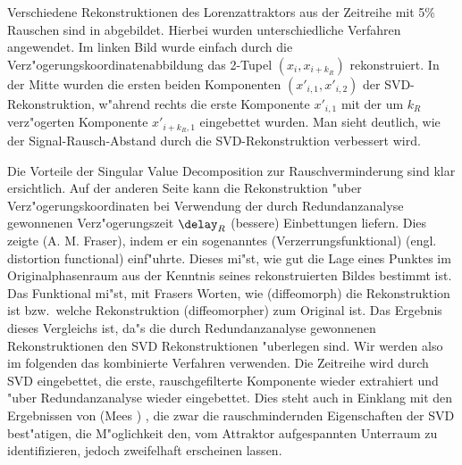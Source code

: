 Verschiedene Rekonstruktionen des Lorenzattraktors aus der Zeitreihe mit 5\% Rauschen sind
in  abgebildet. Hierbei wurden unterschiedliche Verfahren angewendet.
Im linken Bild wurde einfach durch die Verz"ogerungskoordinatenabbildung das 2-Tupel
$(x_i,x_{i+k_R})$ rekonstruiert. In der Mitte wurden die ersten beiden Komponenten
$(x'_{i,1},x'_{i,2})$ der SVD-Rekonstruktion, w"ahrend rechts die erste Komponente
$x'_{i,1}$ mit der um $k_R$ verz"ogerten Komponente $x'_{i+k_R,1}$ eingebettet wurden.
Man sieht deutlich, wie der Signal-Rausch-Abstand durch die SVD-Rekonstruktion verbessert
wird.


Die Vorteile der Singular Value Decomposition zur Rauschverminderung sind klar
ersichtlich. Auf der anderen Seite kann die Rekonstruktion "uber Verz"ogerungskoordinaten
bei Verwendung der durch Redundanzanalyse gewonnenen Verz"ogerungszeit $\delay_R$
\naja(bessere) Einbettungen liefern. Dies zeigte \autor(A. M. Fraser), indem er ein
sogenanntes \begriff(Verzerrungsfunktional) (engl. distortion functional)
einf"uhrte. Dieses mi"st, wie gut die Lage eines Punktes im Originalphasenraum aus der
Kenntnis seines rekonstruierten Bildes bestimmt ist\cite{Fraser}. Das Funktional mi"st,
mit Frasers Worten, wie \naja(diffeomorph) die Rekonstruktion ist bzw.\  welche
Rekonstruktion \naja(diffeomorpher) zum Original ist. Das Ergebnis dieses Vergleichs ist,
da"s die durch Redundanzanalyse gewonnenen Rekonstruktionen den SVD Rekonstruktionen
"uberlegen sind. Wir werden also im folgenden das kombinierte Verfahren verwenden. Die
Zeitreihe wird durch SVD eingebettet, die erste, rauschgefilterte Komponente wieder
extrahiert und "uber Redundanzanalyse wieder eingebettet. Dies steht auch in Einklang mit
den Ergebnissen von \autor(Mees \etal) , die zwar die rauschmindernden
Eigenschaften der SVD best"atigen, die M"oglichkeit den, vom Attraktor aufgespannten
Unterraum zu identifizieren, jedoch zweifelhaft erscheinen lassen\cite{Mees87}.












